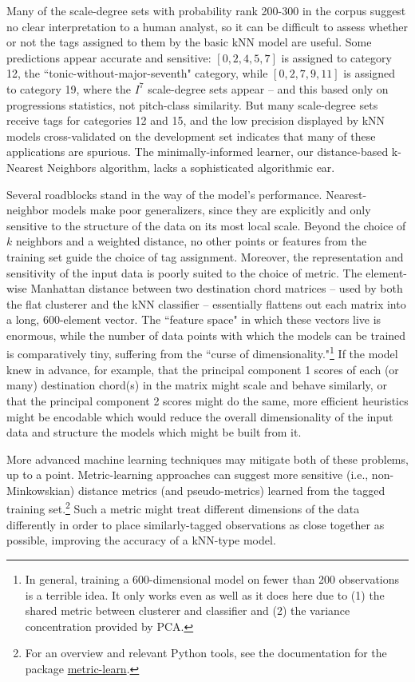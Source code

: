 Many of the scale-degree sets with probability rank 200-300 in the corpus suggest no clear interpretation to a human analyst, so it can be difficult to assess whether or not the tags assigned to them by the basic kNN model are useful.  Some predictions appear accurate and sensitive: $[0,2,4,5,7]$ is assigned to category 12, the ``tonic-without-major-seventh" category, while $[0,2,7,9,11]$ is assigned to category 19, where the $I^7$ scale-degree sets appear -- and this based only on progressions statistics, not pitch-class similarity.  But many scale-degree sets receive tags for categories 12 and 15, and the low precision displayed by kNN models cross-validated on the development set indicates that many of these applications are spurious.  The minimally-informed learner, our distance-based k-Nearest Neighbors algorithm, lacks a sophisticated algorithmic ear.

Several roadblocks stand in the way of the model's performance.  Nearest-neighbor models make poor generalizers, since they are explicitly and only sensitive to the structure of the data on its most local scale.  Beyond the choice of $k$ neighbors and a weighted distance, no other points or features from the training set guide the choice of tag assignment.  Moreover, the representation and sensitivity of the input data is poorly suited to the choice of metric.  The element-wise Manhattan distance between two destination chord matrices -- used by both the flat clusterer and the kNN classifier -- essentially flattens out each matrix into a long, 600-element vector.  The ``feature space" in which these vectors live is enormous, while the number of data points with which the models can be trained is comparatively tiny, suffering from the ``curse of dimensionality."\footnote{In general, training a 600-dimensional model on fewer than 200 observations is a terrible idea.  It only works even as well as it does here due to (1) the shared metric between clusterer and classifier and (2) the variance concentration provided by PCA.}  If the model knew in advance, for example, that the principal component 1 scores of each (or many) destination chord(s) in the matrix might scale and behave similarly, or that the principal component 2 scores might do the same, more efficient heuristics might be encodable which would reduce the overall dimensionality of the input data and structure the models which might be built from it.

More advanced machine learning techniques may mitigate both of these problems, up to a point.  Metric-learning approaches can suggest more sensitive (i.e., non-Minkowskian) distance metrics (and pseudo-metrics) learned from the tagged training set.\footnote{For an overview and relevant Python tools, see the documentation for the package \href{https://github.com/all-umass/metric-learn}{metric-learn}.}  Such a metric might treat different dimensions of the data differently in order to place similarly-tagged observations as close together as possible, improving the accuracy of a kNN-type model. 

